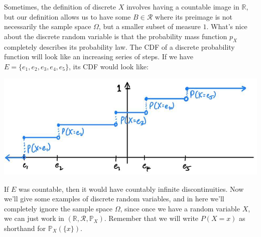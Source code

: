 \documentclass{article}
\begin{document}
      Sometimes, the definition of discrete $X$ involves having a countable image in $\mathbb{R}$, but our definition allows us to have some $B \in \mathcal{R}$ where its preimage is not necessarily the sample space $\Omega$, but a smaller subset of measure $1$. What's nice about the discrete random variable is that the probability mass function $p_X$ completely describes its probability law. The CDF of a discrete probability function will look like an increasing series of steps. If we have $E = \{e_1, e_2, e_3, e_4, e_5\}$, its CDF would look like: 
      \begin{center}
        \includegraphics[scale=0.25]{img/Discrete_CDF.jpg}
      \end{center}
      If $E$ was countable, then it would have countably infinite discontinuities. Now we'll give some examples of discrete random variables, and in here we'll completely ignore the sample space $\Omega$, since once we have a random variable $X$, we can just work in $(\mathbb{R}, \mathcal{R}, \mathbb{P}_X)$. Remember that we will write $P(X = x)$ as shorthand for $\mathbb{P}_X (\{x\})$. 
\end{document}
